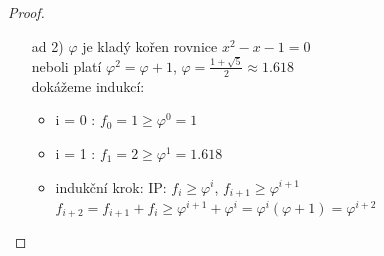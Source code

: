 \begin{proof}
\begin{itemize}
  \item[ad 2)]
  $\varphi$ je kladý kořen rovnice $x^2 - x - 1 = 0$ \\
  neboli platí $\varphi^2 = \varphi + 1$, $\varphi = \frac{1+\sqrt 5}{2}
  \approx 1.618$ \\
  dokážeme indukcí: 
    \begin{itemize}
      \item i = 0 : $f_0 = 1 \geq \varphi^0 = 1$
      \item i = 1 : $f_1 = 2 \geq \varphi^1 = 1.618$
      \item indukční krok: IP: $f_i \geq \varphi^i$, $f_{i+1} \geq
      \varphi^{i+1}$ \\
        $f_{i+2} = f_{i+1} + f_i \geq \varphi^{i+1} + \varphi^i =
	\varphi^i(\varphi + 1) = \varphi^{i+2}$
    \end{itemize}
\end{itemize}
\end{proof}


